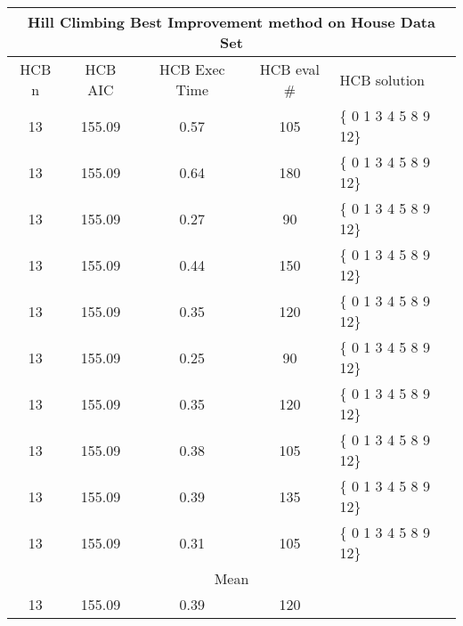 \begin{tabular}{|c|c|c|c|l|}
	\hline
	\multicolumn{5}{|c|}{Hill Climbing Best Improvement method on House Data Set}             \\ \hline
	HCB n & HCB AIC     & HCB Exec Time & HCB eval \# & HCB solution          \\ \hline
	13    & 155.09 & 0.57              & 105                    & \{ 0 1 3 4 5 8 9 12\} \\ \hline
	13    & 155.09 & 0.64              & 180                    & \{ 0 1 3 4 5 8 9 12\} \\ \hline
	13    & 155.09 & 0.27              & 90                     & \{ 0 1 3 4 5 8 9 12\} \\ \hline
	13    & 155.09 & 0.44               & 150                    & \{ 0 1 3 4 5 8 9 12\} \\ \hline
	13    & 155.09 & 0.35              & 120                    & \{ 0 1 3 4 5 8 9 12\} \\ \hline
	13    & 155.09 & 0.25              & 90                     & \{ 0 1 3 4 5 8 9 12\} \\ \hline
	13    & 155.09 & 0.35               & 120                    & \{ 0 1 3 4 5 8 9 12\} \\ \hline
	13    & 155.09 & 0.38              & 105                    & \{ 0 1 3 4 5 8 9 12\} \\ \hline
	13    & 155.09 & 0.39              & 135                    & \{ 0 1 3 4 5 8 9 12\} \\ \hline
	13    & 155.09 & 0.31               & 105                    & \{ 0 1 3 4 5 8 9 12\} \\ \hline
	\multicolumn{5}{|c|}{Mean}                                                                \\ \hline
	13    & 155.09 & 0.39             & 120                    &                       \\ \hline
\end{tabular}

